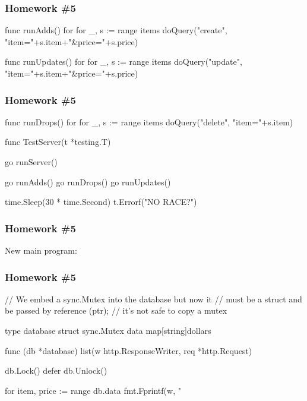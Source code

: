 \documentclass[handout,compress,t,11pt]{beamer}
\begin{document}
\begin{frame}[fragile]
    \frametitle{Homework \#5}
\begin{golang}
func runAdds() {
	for {
		for _, s := range items {
			doQuery("create", 
                    "item="+s.item+"&price="+s.price)
		}
	}
}

func runUpdates() {
	for {
		for _, s := range items {
			doQuery("update", 
                    "item="+s.item+"&price="+s.price)
		}
	}
}
\end{golang}
\end{frame}

\begin{frame}[fragile]
    \frametitle{Homework \#5}
\begin{golang}
func runDrops() {
	for {
		for _, s := range items {
			doQuery("delete", "item="+s.item)
		}
	}
}

func TestServer(t *testing.T) {
	go runServer()

	go runAdds()
	go runDrops()
	go runUpdates()

	time.Sleep(30 * time.Second)
	t.Errorf("NO RACE?")
}
\end{golang}
\end{frame}

\begin{frame}[fragile]
    \frametitle{Homework \#5}
    New main program:
\end{frame}

\begin{frame}[fragile]
    \frametitle{Homework \#5}
\begin{golang}
// We embed a sync.Mutex into the database but now it
// must be a struct and be passed by reference (ptr);
// it's not safe to copy a mutex

type database struct {
	sync.Mutex
	data map[string]dollars
}

func (db *database) list(w http.ResponseWriter, 
                         req *http.Request) {
	db.Lock()
	defer db.Unlock()

	for item, price := range db.data {
		fmt.Fprintf(w, "%
	}
}
\end{golang}
\end{frame}
\end{document}
